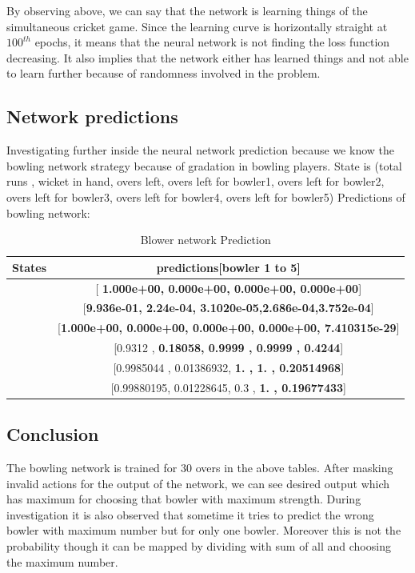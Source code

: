 By observing above, we can say that the network is learning things of the simultaneous cricket game. Since the learning curve is horizontally straight at $100^{th}$ epochs, it means that the neural network is not finding the loss function decreasing. It also implies that the network either has learned things and not able to learn further because of randomness involved in the problem. 
\subsection{Network predictions}
Investigating further inside the neural network prediction because we know the bowling network strategy because of gradation in bowling players.
State is  (total runs ,  wicket in hand,  overs left,  overs left for bowler1,  overs  left  for  bowler2,  overs  left  for  bowler3,  overs  left  for  bowler4,  overs  left for  bowler5)
Predictions of bowling network:


\begin{table}[h!]
\center
\begin{tabular}{ |c||c|}

 \hline
 States    &  predictions[bowler 1 to 5]\\
 \hline
[239,   6,    15,   3,   3,   3,   3,   3] &[ \textbf{1.000e+00, 0.000e+00, 0.000e+00, 0.000e+00}] \\
\hline
[61,  8,  5,  1,  1,  1,  1,  1] & [\textbf{9.936e-01, 2.24e-04, 3.1020e-05,2.686e-04,3.752e-04}] \\
 \hline
 [457,   3,  10,   2,   2,   2,   2,   2] & [\textbf{1.000e+00, 0.000e+00, 0.000e+00, 0.000e+00, 7.410315e-29}]\\
\hline
[212, 5, 14, 0, 2, 12, 2, 0] & [0.9312 ,\textbf{ 0.18058, 0.9999 , 0.9999 , 0.4244}] \\
\hline
[411, 5, 4, 0, 0, 4, 2, 0] & [0.9985044 , 0.01386932,\textbf{ 1.        , 1.        , 0.20514968}]\\
\hline 
[411, 5, 2, 0, 0, 0, 1, 1] &  [0.99880195, 0.01228645, 0.3        , \textbf{1.        , 0.19677433}]\\ 
\hline
 
\end{tabular}
\caption{Blower network Prediction}
\label{table:1}
\end{table}

\subsection{Conclusion}
The bowling network is trained for 30 overs in the above tables. After masking invalid actions for the output of the network, we can see desired output which has maximum for choosing that bowler with maximum strength. During investigation it is also observed that sometime it tries to predict the wrong bowler with maximum number but for only one bowler. Moreover this is not the probability though it can be mapped by dividing with sum of all and choosing the maximum number.
